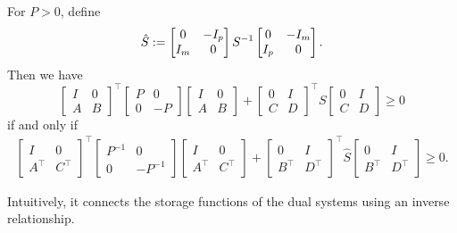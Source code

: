 \begin{lemma}\label{ch5:lem:diss dual}
For  $P > 0$, define
\begin{equation}
\label{ch5:eq:Shat}
 \hat{S}:=\begin{bmatrix} 0&-I_p\\
 I_m&0 \end{bmatrix} S\inv \begin{bmatrix} 0&-I_m\\I_p&0 \end{bmatrix}.
\end{equation}
Then we have
\begin{equation}
\label{ch5:eq:eqL1}
\begin{bmatrix}
I&0\\
A&B
\end{bmatrix}^\top\!\!\begin{bmatrix}
P&0\\
0&-P
\end{bmatrix}\begin{bmatrix}
I&0\\
A&B
\end{bmatrix}+\begin{bmatrix}
0&I\\
C&D
\end{bmatrix}^\top\!\! S \begin{bmatrix}
0&I\\
C&D
\end{bmatrix}\geq 0
\end{equation}
if and only if 
\begin{align}\label{ch5:eq:L2}
\begin{bmatrix}
I&0 \!\\
A^\top&C^\top\!
\end{bmatrix}^\top\!\!\!\begin{bmatrix}
P^{-1}&0\\
0&-P^{-1}
\end{bmatrix}\!\!\!
\begin{bmatrix}
I&0\!\! \\
A^\top&C^\top\!\!
\end{bmatrix}\!\!+\!\!\begin{bmatrix}
0&I \!\! \\
B^\top&D^\top \!\!
\end{bmatrix}^\top\!\!\!\! \hat{S}\!\! \begin{bmatrix}
0&I \!\! \\
B^\top&D^\top \!\!
\end{bmatrix} \!\!\geq\! 0.
\end{align}
\end{lemma}
Intuitively, it connects the storage functions of the dual systems using an inverse relationship.

